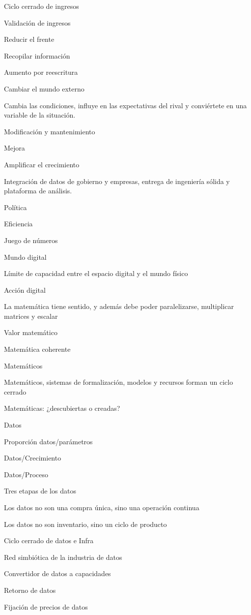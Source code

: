 \documentclass{article}
\begin{document}
Ciclo cerrado de ingresos

Validación de ingresos

Reducir el frente

Recopilar información

Aumento por reescritura

Cambiar el mundo externo

Cambia las condiciones, influye en las expectativas del rival y conviértete en una variable de la situación.

Modificación y mantenimiento

Mejora

Amplificar el crecimiento

Integración de datos de gobierno y empresas, entrega de ingeniería sólida y plataforma de análisis.

Política

Eficiencia

Juego de números

Mundo digital

Límite de capacidad entre el espacio digital y el mundo físico

Acción digital

La matemática tiene sentido, y además debe poder paralelizarse, multiplicar matrices y escalar

Valor matemático

Matemática coherente

Matemáticos

Matemáticos, sistemas de formalización, modelos y recursos forman un ciclo cerrado

Matemáticas: ¿descubiertas o creadas?

Datos

Proporción datos/parámetros

Datos/Crecimiento

Datos/Proceso

Tres etapas de los datos

Los datos no son una compra única, sino una operación continua

Los datos no son inventario, sino un ciclo de producto

Ciclo cerrado de datos e Infra

Red simbiótica de la industria de datos

Convertidor de datos a capacidades

Retorno de datos

Fijación de precios de datos
\end{document}
